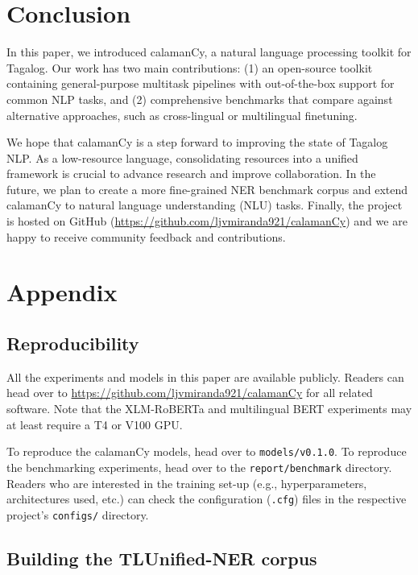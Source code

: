 \documentclass[11pt]{article}
\begin{document}
\section{Conclusion}

In this paper, we introduced calamanCy, a natural language processing toolkit for Tagalog.
Our work has two main contributions: (1) an open-source toolkit containing general-purpose multitask pipelines with out-of-the-box support for common NLP tasks, and
(2) comprehensive benchmarks that compare against alternative approaches, such as cross-lingual or multilingual finetuning. 

We hope that calamanCy is a step forward to improving the state of Tagalog NLP. 
As a low-resource language, consolidating resources into a unified framework is crucial to advance research and improve collaboration.
In the future, we plan to create a more fine-grained NER benchmark corpus and extend calamanCy to natural language understanding (NLU) tasks.
Finally, the project is hosted on GitHub (\url{https://github.com/ljvmiranda921/calamanCy}) and we are happy to receive community feedback and contributions.

\newpage



\appendix

\section{Appendix}

\subsection{Reproducibility}


All the experiments and models in this paper are available publicly. 
Readers can head over to \url{https://github.com/ljvmiranda921/calamanCy} for all related software.
Note that the XLM-RoBERTa and multilingual BERT experiments may at least require a T4 or V100 GPU.

To reproduce the calamanCy models, head over to \texttt{models/v0.1.0}.
To reproduce the benchmarking experiments, head over to the \texttt{report/benchmark} directory.
Readers who are interested in the training set-up (e.g., hyperparameters, architectures used, etc.) can check the configuration (\texttt{.cfg}) files in the respective project's \texttt{configs/} directory.

\subsection{Building the TLUnified-NER corpus}
\end{document}
